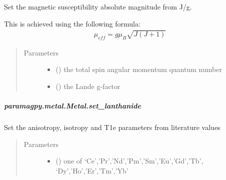 \documentclass[a4paper,10pt,english,openany,oneside]{sphinxmanual}
\begin{document}
\begin{fulllineitems}
\begin{fulllineitems}
\begin{fulllineitems}
\label{\detokenize{reference/generated/paramagpy.metal.Metal.set_Jg:paramagpy.metal.Metal.set_Jg}}
Set the magnetic susceptibility absolute magnitude from J/g.

This is achieved using the following formula:
\begin{equation*}
\begin{split}\mu_{eff}=g\mu_B\sqrt{J(J+1)}\end{split}
\end{equation*}\begin{quote}\begin{description}
\item[{Parameters}] \leavevmode\begin{itemize}
\item {} 
 () \textendash{} the total spin angular momentum quantum number

\item {} 
 (\sphinxstyleliteralemphasis{\sphinxupquote{, }}) \textendash{} the Lande g-factor

\end{itemize}

\end{description}\end{quote}

\end{fulllineitems}



\subparagraph{paramagpy.metal.Metal.set\_lanthanide}
\label{\detokenize{reference/generated/paramagpy.metal.Metal.set_lanthanide:paramagpy-metal-metal-set-lanthanide}}\label{\detokenize{reference/generated/paramagpy.metal.Metal.set_lanthanide::doc}}

\begin{fulllineitems}
\label{\detokenize{reference/generated/paramagpy.metal.Metal.set_lanthanide:paramagpy.metal.Metal.set_lanthanide}}
Set the anisotropy, isotropy and T1e parameters from
literature values
\begin{quote}\begin{description}
\item[{Parameters}] \leavevmode\begin{itemize}
\item {} 
 () \textendash{} one of ‘Ce’,’Pr’,’Nd’,’Pm’,’Sm’,’Eu’,’Gd’,’Tb’,
‘Dy’,’Ho’,’Er’,’Tm’,’Yb’


\end{itemize}
\end{description}
\end{quote}
\end{fulllineitems}
\end{fulllineitems}
\end{fulllineitems}
\end{document}
